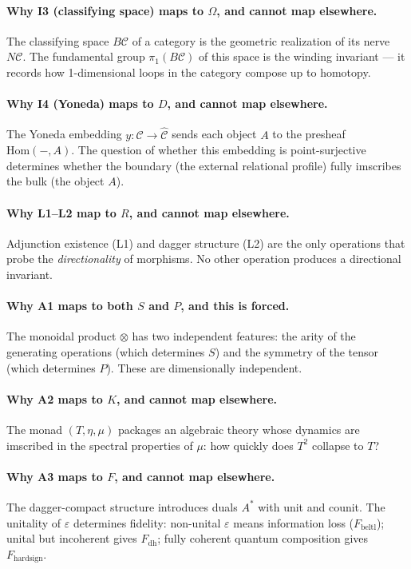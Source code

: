 \documentclass[12pt,a4paper]{article}
\begin{document}
\paragraph{Why I3 (classifying space) maps to $\Omega$, and cannot map elsewhere.}
The classifying space $B\mathcal{C}$ of a category is the geometric realization of its nerve $N\mathcal{C}$. The fundamental group $\pi_1(B\mathcal{C})$ of this space is the winding invariant --- it records how 1-dimensional loops in the category compose up to homotopy.

\paragraph{Why I4 (Yoneda) maps to $D$, and cannot map elsewhere.}
The Yoneda embedding $y: \mathcal{C} \to \hat{\mathcal{C}}$ sends each object $A$ to the presheaf $\text{Hom}(-,A)$. The question of whether this embedding is point-surjective determines whether the boundary (the external relational profile) fully imscribes the bulk (the object $A$).

\paragraph{Why L1--L2 map to $R$, and cannot map elsewhere.}
Adjunction existence (L1) and dagger structure (L2) are the only operations that probe the \emph{directionality} of morphisms. No other operation produces a directional invariant.

\paragraph{Why A1 maps to both $S$ and $P$, and this is forced.}
The monoidal product $\otimes$ has two independent features: the arity of the generating operations (which determines $S$) and the symmetry of the tensor (which determines $P$). These are dimensionally independent.

\paragraph{Why A2 maps to $K$, and cannot map elsewhere.}
The monad $(T, \eta, \mu)$ packages an algebraic theory whose dynamics are imscribed in the spectral properties of $\mu$: how quickly does $T^2$ collapse to $T$?

\paragraph{Why A3 maps to $F$, and cannot map elsewhere.}
The dagger-compact structure introduces duals $A^*$ with unit and counit. The unitality of $\varepsilon$ determines fidelity: non-unital $\varepsilon$ means information loss ($F_{\text{beltl}}$); unital but incoherent gives $F_{\text{dh}}$; fully coherent quantum composition gives $F_{\text{hardsign}}$.
\end{document}
